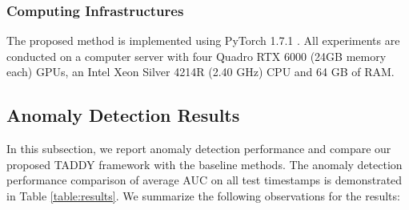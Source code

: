 \documentclass[10pt,journal,compsoc]{IEEEtran}
\newcommand{\HL}{}
\begin{document}
\subsubsection{\HL{Computing Infrastructures}} 
\HL{The proposed method is implemented using PyTorch 1.7.1 \cite{paszke2019pytorch}. 
All experiments are conducted on a computer server with four Quadro RTX 6000 (24GB memory each) GPUs, an Intel Xeon Silver 4214R (2.40 GHz) CPU and 64 GB of RAM.}

\subsection{Anomaly Detection Results}

In this subsection, we report anomaly detection performance and compare our proposed TADDY framework with the baseline methods. The anomaly detection performance comparison of average AUC on all test timestamps is demonstrated in Table \ref{table:results}. We summarize the following observations for the results:
\end{document}
